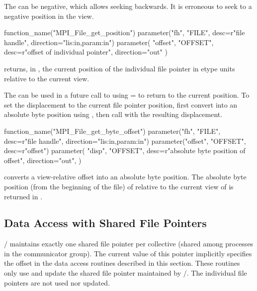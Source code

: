 The  can be negative, which allows seeking backwards.
It is erroneous to seek to a negative position in the view.

%
%
\begin{mpi-binding}
    function_name("MPI_File_get_position")
    parameter("fh", "FILE", desc=r"file handle", direction="lis:in,param:in")
    parameter(
        "offset", "OFFSET", desc=r"offset of individual pointer", direction="out"
    )
\end{mpi-binding}

 returns, in ,
the current position of the individual file pointer in etype units
relative to the current view.

\begin{users}
The  can be used in a future call to 
using  =  to return to the current position.
To set the displacement to the current file pointer position,
first convert  into an absolute byte position using
,
then call  with the resulting
displacement.
\end{users}

%
%
\begin{mpi-binding}
    function_name("MPI_File_get_byte_offset")
    parameter("fh", "FILE", desc=r"file handle", direction="lis:in,param:in")
    parameter("offset", "OFFSET", desc=r"offset")
    parameter(
        "disp",
        "OFFSET",
        desc=r"absolute byte position of offset",
        direction="out",
    )
\end{mpi-binding}

 converts a view-relative offset
into an absolute byte position.
The absolute byte position (from the beginning of the file)
of  relative to the current view of 
is returned in .

\subsection{Data Access with Shared File Pointers}
\label{sec:io-shared-ptr}

\MPI/ maintains exactly one shared file pointer
per collective 
(shared among processes in the communicator group).
The current value of this pointer implicitly specifies
the offset in the data access routines described in this section.
These routines only use and update the shared file pointer
maintained by \MPI/.
The individual file pointers are not used nor updated.

